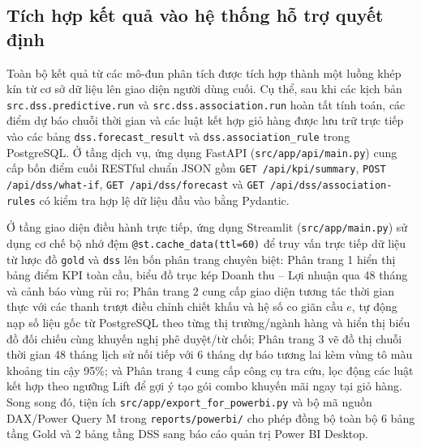 \subsection{Tích hợp kết quả vào hệ thống hỗ trợ quyết định}

Toàn bộ kết quả từ các mô-đun phân tích được tích hợp thành một luồng khép kín từ cơ sở dữ liệu lên giao diện người dùng cuối. Cụ thể, sau khi các kịch bản \texttt{src.dss.predictive.run} và \texttt{src.dss.association.run} hoàn tất tính toán, các điểm dự báo chuỗi thời gian và các luật kết hợp giỏ hàng được lưu trữ trực tiếp vào các bảng \texttt{dss.forecast\_result} và \texttt{dss.association\_rule} trong PostgreSQL. Ở tầng dịch vụ, ứng dụng FastAPI (\texttt{src/app/api/main.py}) cung cấp bốn điểm cuối RESTful chuẩn JSON gồm \texttt{GET /api/kpi/summary}, \texttt{POST /api/dss/what-if}, \texttt{GET /api/dss/forecast} và \texttt{GET /api/dss/association-rules} có kiểm tra hợp lệ dữ liệu đầu vào bằng Pydantic.

Ở tầng giao diện điều hành trực tiếp, ứng dụng Streamlit (\texttt{src/app/main.py}) sử dụng cơ chế bộ nhớ đệm \texttt{@st.cache\_data(ttl=60)} để truy vấn trực tiếp dữ liệu từ lược đồ \texttt{gold} và \texttt{dss} lên bốn phân trang chuyên biệt: Phân trang 1 hiển thị bảng điểm KPI toàn cầu, biểu đồ trục kép Doanh thu -- Lợi nhuận qua 48 tháng và cảnh báo vùng rủi ro; Phân trang 2 cung cấp giao diện tương tác thời gian thực với các thanh trượt điều chỉnh chiết khấu và hệ số co giãn cầu $e$, tự động nạp số liệu gốc từ PostgreSQL theo từng thị trường/ngành hàng và hiển thị biểu đồ đối chiếu cùng khuyến nghị phê duyệt/từ chối; Phân trang 3 vẽ đồ thị chuỗi thời gian 48 tháng lịch sử nối tiếp với 6 tháng dự báo tương lai kèm vùng tô màu khoảng tin cậy 95\%; và Phân trang 4 cung cấp công cụ tra cứu, lọc động các luật kết hợp theo ngưỡng Lift để gợi ý tạo gói combo khuyến mãi ngay tại giỏ hàng. Song song đó, tiện ích \texttt{src/app/export\_for\_powerbi.py} và bộ mã nguồn DAX/Power Query M trong \texttt{reports/powerbi/} cho phép đồng bộ toàn bộ 6 bảng tầng Gold và 2 bảng tầng DSS sang báo cáo quản trị Power BI Desktop.
